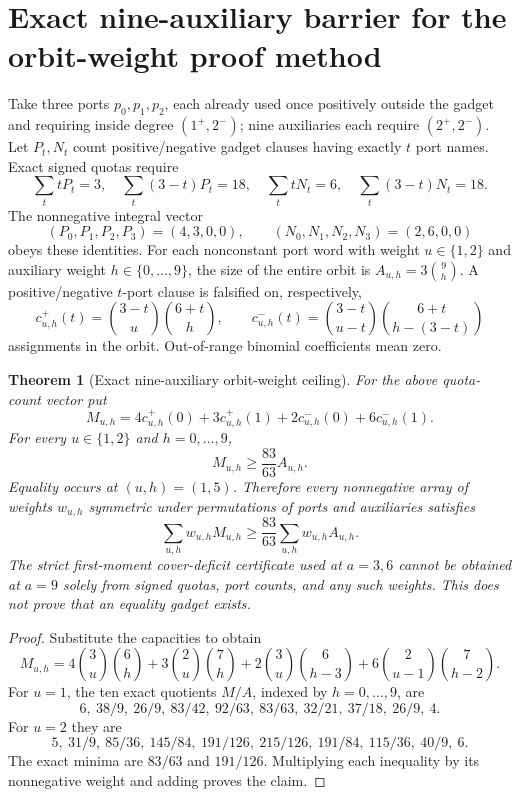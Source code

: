 \documentclass[11pt]{article}
\newtheorem{theorem}{Theorem}
\begin{document}
\section{Exact nine-auxiliary barrier for the orbit-weight proof method}
Take three ports $p_0,p_1,p_2$, each already used once positively outside the gadget and requiring inside degree $(1^+,2^-)$; nine auxiliaries each require $(2^+,2^-)$. Let $P_t,N_t$ count positive/negative gadget clauses having exactly $t$ port names. Exact signed quotas require
\[
\sum_t tP_t=3,\quad\sum_t(3-t)P_t=18,\quad
\sum_t tN_t=6,\quad\sum_t(3-t)N_t=18.
\]
The nonnegative integral vector
\[
(P_0,P_1,P_2,P_3)=(4,3,0,0),\qquad
(N_0,N_1,N_2,N_3)=(2,6,0,0)
\]
obeys these identities. For each nonconstant port word with weight $u\in\{1,2\}$ and auxiliary weight $h\in\{0,\ldots,9\}$, the size of the entire orbit is $A_{u,h}=3\binom9h$. A positive/negative $t$-port clause is falsified on, respectively,
\[
c^+_{u,h}(t)=\binom{3-t}u\binom{6+t}h,\qquad
c^-_{u,h}(t)=\binom{3-t}{u-t}\binom{6+t}{h-(3-t)}
\]
assignments in the orbit. Out-of-range binomial coefficients mean zero.
\begin{theorem}[Exact nine-auxiliary orbit-weight ceiling]
For the above quota-count vector put
\[
M_{u,h}=4c^+_{u,h}(0)+3c^+_{u,h}(1)+2c^-_{u,h}(0)+6c^-_{u,h}(1).
\]
For every $u\in\{1,2\}$ and $h=0,\ldots,9$,
\[
\boxed{M_{u,h}\ge\frac{83}{63}A_{u,h}.}
\]
Equality occurs at $(u,h)=(1,5)$. Therefore every nonnegative array of weights $w_{u,h}$ symmetric under permutations of ports and auxiliaries satisfies
\[
\sum_{u,h}w_{u,h}M_{u,h}\ge\frac{83}{63}\sum_{u,h}w_{u,h}A_{u,h}.
\]
The strict first-moment cover-deficit certificate used at $a=3,6$ cannot be obtained at $a=9$ solely from signed quotas, port counts, and any such weights. This does not prove that an equality gadget exists.
\end{theorem}
\begin{proof}
Substitute the capacities to obtain
\[
M_{u,h}=4\binom3u\binom6h+3\binom2u\binom7h+
2\binom3u\binom6{h-3}+6\binom2{u-1}\binom7{h-2}.
\]
For $u=1$, the ten exact quotients $M/A$, indexed by $h=0,\ldots,9$, are
\[
6,\ 38/9,\ 26/9,\ 83/42,\ 92/63,\ 83/63,\ 32/21,\ 37/18,\ 26/9,\ 4.
\]
For $u=2$ they are
\[
5,\ 31/9,\ 85/36,\ 145/84,\ 191/126,\ 215/126,\ 191/84,\
115/36,\ 40/9,\ 6.
\]
The exact minima are $83/63$ and $191/126$. Multiplying each inequality by its nonnegative weight and adding proves the claim.
\end{proof}
\end{document}
